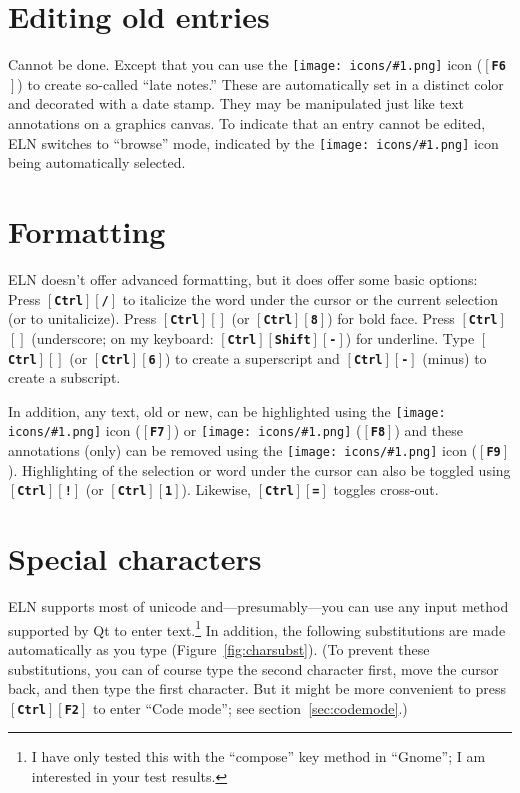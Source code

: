 \documentclass[11pt]{report}
\def\keystroke#1{$\left[\right.\!${\tt\bfseries #1}$\!\left.\right]$}
\def\key#1{\keystroke{#1}}
\def\keycombo#1#2{\keystroke{#1}\keystroke{#2}}
\def\keycontrol#1{\keycombo{Ctrl}{#1}}
\def\controlshift#1{\keystroke{Ctrl}\keystroke{Shift}\keystroke{#1}}
\def\keyctrlhat{\keycontrol{\char94}}
\def\keyctrlunderscore{\keycontrol{\char95}}
\def\icon#1{\raise-2pt\hbox{\texttt{[image: icons/\#1.png]}}}
\begin{document}
\section{Editing old entries}

Cannot be done. Except that you can use the \icon{note} icon (\key{F6}) to
create so-called ``late notes.'' These are automatically set in a
distinct color and decorated with a date stamp. They
may be manipulated just like text annotations on a graphics canvas. To
indicate that an entry cannot be edited, ELN switches to ``browse''
mode, indicated by the \icon{browse} icon being automatically selected.

\section{Formatting}

ELN doesn't offer advanced formatting, but it does offer some basic
options: Press \keycontrol{/} to italicize the word under the
cursor or the current selection (or to unitalicize). Press
\keycontrol{*} (or \keycontrol{8}) for bold face. Press
\keyctrlunderscore{} (underscore; on my keyboard:
\controlshift{-}) for underline. Type
\keyctrlhat{} (or \keycontrol{6}) to create a
superscript and \keycontrol{-} (minus) to create a subscript.

In addition, any text, old or new, can be highlighted using the
\icon{highlight} icon (\key{F7}) or \icon{strikeout} (\key{F8}) and these
annotations (only) can be removed using the \icon{plain} icon
(\key{F9}). Highlighting of the selection or word under the cursor can
also be toggled using \keycontrol{!} (or \keycontrol{1}). Likewise,
\keycontrol{=} toggles cross-out.

\section{Special characters}

ELN supports most of unicode and---presumably---you can use any input
method supported by Qt to enter text.\footnote{I have only tested this
  with the ``compose'' key method in ``Gnome''; I am interested in
  your test results.} In addition, the following substitutions are
made automatically as you type (Figure~\ref{fig:charsubst}).  (To
prevent these substitutions, you can of course type the second
character first, move the cursor back, and then type the first
character. But it might be more convenient to press \keycontrol{F2} to
enter ``Code mode''; see section~\ref{sec:codemode}.)
\end{document}
